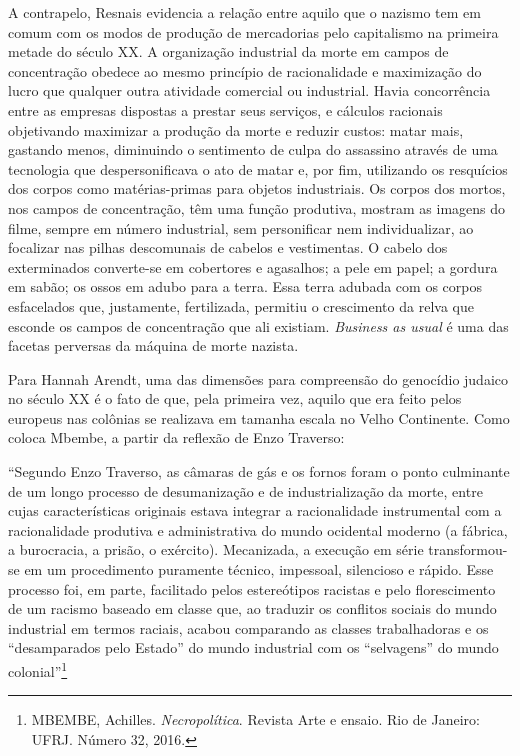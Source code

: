 A contrapelo, Resnais evidencia a relação entre aquilo que o nazismo tem
em comum com os modos de produção de mercadorias pelo capitalismo na
primeira metade do século XX. A organização industrial da morte em
campos de concentração obedece ao mesmo princípio de racionalidade e
maximização do lucro que qualquer outra atividade comercial ou
industrial. Havia concorrência entre as empresas dispostas a prestar
seus serviços, e cálculos racionais objetivando maximizar a produção da
morte e reduzir custos: matar mais, gastando menos, diminuindo o
sentimento de culpa do assassino através de uma tecnologia que
despersonificava o ato de matar e, por fim, utilizando os resquícios dos
corpos como matérias-primas para objetos industriais. Os corpos dos
mortos, nos campos de concentração, têm uma função produtiva, mostram as
imagens do filme, sempre em número industrial, sem personificar nem
individualizar, ao focalizar nas pilhas descomunais de cabelos e
vestimentas. O cabelo dos exterminados converte-se em cobertores e
agasalhos; a pele em papel; a gordura em sabão; os ossos em adubo para a
terra. Essa terra adubada com os corpos esfacelados que, justamente,
fertilizada, permitiu o crescimento da relva que esconde os campos de
concentração que ali existiam. \emph{Business as usual} é uma das
facetas perversas da máquina de morte nazista.

Para Hannah Arendt, uma das dimensões para compreensão do genocídio
judaico no século XX é o fato de que, pela primeira vez, aquilo que era
feito pelos europeus nas colônias se realizava em tamanha escala no
Velho Continente. Como coloca Mbembe, a partir da reflexão de Enzo
Traverso:

``Segundo Enzo Traverso, as câmaras de gás e os fornos foram o ponto
culminante de um longo processo de desumanização e de industrialização
da morte, entre cujas características originais estava integrar a
racionalidade instrumental com a racionalidade produtiva e
administrativa do mundo ocidental moderno (a fábrica, a burocracia, a
prisão, o exército). Mecanizada, a execução em série transformou-se em
um procedimento puramente técnico, impessoal, silencioso e rápido. Esse
processo foi, em parte, facilitado pelos estereótipos racistas e pelo
florescimento de um racismo baseado em classe que, ao traduzir os
conflitos sociais do mundo industrial em termos raciais, acabou
comparando as classes trabalhadoras e os ``desamparados pelo Estado'' do
mundo industrial com os ``selvagens'' do mundo colonial''\footnote{MBEMBE,
  Achilles. \emph{Necropolítica}. Revista Arte e ensaio. Rio de Janeiro:
  UFRJ. Número 32, 2016.}

